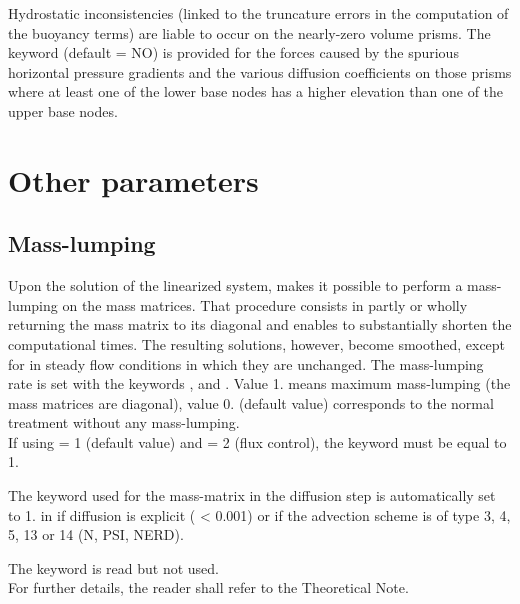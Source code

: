 Hydrostatic inconsistencies (linked to the truncature errors in the computation
of the buoyancy terms) are liable to occur on the nearly-zero volume prisms.
The keyword  (default = NO) is
provided for the forces caused by the spurious horizontal pressure gradients
and the various diffusion coefficients on those prisms where at least one of
the lower base nodes has a higher elevation than one of the upper base nodes.

\section{Other parameters}

\subsection{Mass-lumping}

Upon the solution of the linearized system,  makes it possible to
perform a mass-lumping on the mass matrices. That procedure consists in partly
or wholly returning the mass matrix to its diagonal and enables to
substantially shorten the computational times. The resulting solutions,
however, become smoothed, except for in steady flow conditions in which they
are unchanged. The mass-lumping rate is set with the keywords
,
 and . Value 1. means maximum mass-lumping (the mass matrices are
diagonal), value 0. (default value) corresponds to the normal treatment without
any mass-lumping.\\

If using  = 1 (default value)
and  = 2 (flux control),
the keyword  must be equal to 1.

The keyword  used for the mass-matrix
in the diffusion step is automatically set to 1. in 
if diffusion is explicit ( < 0.001)
or if the advection scheme is of type 3, 4, 5, 13 or 14 (N, PSI, NERD).

The keyword  is read but not used.\\

For further details, the reader shall refer to the 
Theoretical Note.

